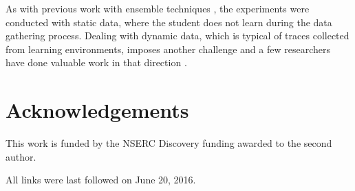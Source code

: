 \documentclass[runningheads,a4paper]{llncs}
\begin{document}
As with previous work with ensemble techniques \cite{desmarais2015combining,pengxu2016}, the experiments were conducted with static data, where the student does not learn during the data gathering process.  Dealing with dynamic data, which is typical of traces collected from learning environments, imposes another challenge and a few researchers have done valuable work in that direction \cite{matsudamachine2015,gonzalez2015modeling,aleven2013knowledge}.

\section{Acknowledgements}

This work is funded by the NSERC Discovery funding awarded to the second author.




All links were last followed on June 20, 2016.
\end{document}
